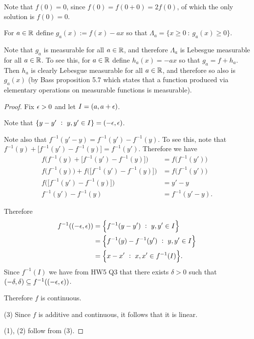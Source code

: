 Note that $f(0) = 0$, since $f(0) = f(0 + 0) = 2f(0)$, of which the only solution is $f(0) = 0$.

For $a \in \mathbb{R}$ define $g_a(x) := f(x) - ax$ so that $\Lambda_a = \{x \geq 0 ~:~ g_a(x) \geq 0\}$.

Note that $g_a$ is measurable for all $a \in \mathbb{R}$, and therefore $\Lambda_a$ is Lebesgue measurable for
all $a \in \mathbb{R}$. To see this, for $a \in \mathbb{R}$ define $h_a(x) = -ax$ so that $g_a = f + h_a$. Then $h_a$ is
clearly Lebesgue measurable for all $a \in \mathbb{R}$, and therefore so also is $g_a(x)$ (by Bass proposition 5.7
which states that a function produced via elementary operations on measurable functions is measurable).

\begin{proof}
  Fix $\epsilon > 0$ and let $I = (a, a + \epsilon)$.

  Note that $\{y - y' ~:~ y, y' \in I\} = (-\epsilon, \epsilon)$.

  Note also that $f^{-1}(y' - y) = f^{-1}(y') - f^{-1}(y)$. To see this, note
  that $f^{-1}(y) + \big[f^{-1}(y') - f^{-1}(y)\big] = f^{-1}(y')$. Therefore we have
  \begin{align*}
    f\Big(f^{-1}(y) + \big[f^{-1}(y') - f^{-1}(y)\big]\Big) &= f\big(f^{-1}(y')\big) \\
    f\Big(f^{-1}(y)\Big) + f\Big(\big[f^{-1}(y') - f^{-1}(y)\big]\Big) &= f\big(f^{-1}(y')\big) \\
    f\Big(\big[f^{-1}(y') - f^{-1}(y)\big]\Big) &= y' - y \\
    f^{-1}(y') - f^{-1}(y) &= f^{-1}(y' - y).
  \end{align*}

  Therefore
  \begin{align*}
    f^{-1}((-\epsilon, \epsilon))
    &= \Big\{f^{-1}(y - y') ~:~ y, y' \in I\Big\} \\
    &= \Big\{f^{-1}(y) - f^{-1}(y') ~:~ y, y' \in I\Big\} \\
    &= \Big\{x - x' ~:~ x, x' \in f^{-1}(I)\Big\}.
  \end{align*}
  Since $f^{-1}(I)$ we have from HW5 Q3 that there exists $\delta > 0$ such
  that $(-\delta, \delta) \subseteq f^{-1}((-\epsilon, \epsilon))$.

  Therefore $f$ is continuous.

  (3) Since $f$ is additive and continuous, it follows that it is linear.

  (1), (2) follow from (3).
\end{proof}




